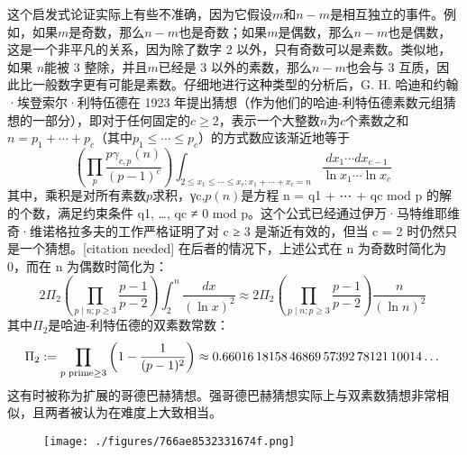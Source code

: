 这个启发式论证实际上有些不准确，因为它假设\(m\)和\(n-m\)是相互独立的事件。例如，如果\(m\)是奇数，那么\(n-m\)也是奇数；如果\(m\)是偶数，那么\(n-m\)也是偶数，这是一个非平凡的关系，因为除了数字 2 以外，只有奇数可以是素数。类似地，如果 \(n\)能被 3 整除，并且\(m\)已经是 3 以外的素数，那么\(n-m\)也会与 3 互质，因此比一般数字更有可能是素数。仔细地进行这种类型的分析后，G. H. 哈迪和约翰·埃登索尔·利特伍德在 1923 年提出猜想（作为他们的哈迪-利特伍德素数元组猜想的一部分），即对于任何固定的\(c\ge2\)，表示一个大整数\(n\)为\(c\)个素数之和\(n = p_1+\cdots +p_c\)（其中\(p_1 \leq \cdots \leq p_c\)）的方式数应该渐近地等于
\[
\left(\prod _{p}{\frac {p\gamma _{c,p}(n)}{(p-1)^{c}}}\right)\int _{2\leq x_{1}\leq \cdots \leq x_{c}:x_{1}+\cdots +x_{c}=n}{\frac {dx_{1}\cdots dx_{c-1}}{\ln x_{1}\cdots \ln x_{c}}}~
\]
其中，乘积是对所有素数\(p\)求积，γc,\(p(n)\)是方程 n = q1 + ⋯ + qc mod p 的解的个数，满足约束条件 q1, …, qc ≠ 0 mod p。这个公式已经通过伊万·马特维耶维奇·维诺格拉多夫的工作严格证明了对 c ≥ 3 是渐近有效的，但当 c = 2 时仍然只是一个猜想。[citation needed] 在后者的情况下，上述公式在 n 为奇数时简化为 0，而在 n 为偶数时简化为：
\[
2\Pi _{2}\left(\prod _{p\mid n;p\geq 3}{\frac {p-1}{p-2}}\right)\int _{2}^{n}{\frac {dx}{(\ln x)^{2}}}\approx 2\Pi _{2}\left(\prod _{p\mid n;p\geq 3}{\frac {p-1}{p-2}}\right){\frac {n}{(\ln n)^{2}}}~
\]
其中\(\Pi _{2}\)是哈迪-利特伍德的双素数常数：
\[
\Pi _{2}:=\prod _{p\;{\rm {prime}}\geq 3}\left(1-{\frac {1}{(p-1)^{2}}}\right)\approx 0.66016\,18158\,46869\,57392\,78121\,10014\dots~
\]
这有时被称为扩展的哥德巴赫猜想。强哥德巴赫猜想实际上与双素数猜想非常相似，且两者被认为在难度上大致相当。
\begin{figure}[ht]
\centering
\texttt{[image: ./figures/766ae8532331674f.png]}
\caption{} \label{fig_GDBHCX_4}
\end{figure}